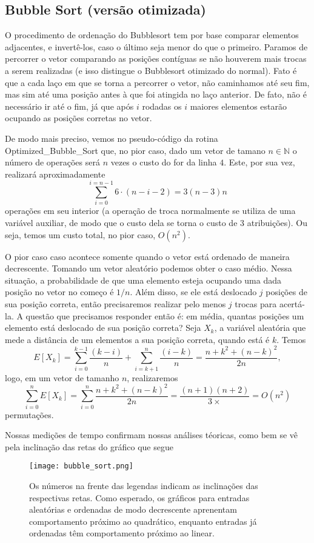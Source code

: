 \documentclass{article}
\begin{document}
\subsection{Bubble Sort (versão otimizada)}
O procedimento de ordenação do Bubblesort tem por base comparar elementos adjacentes, e invertê-los, caso o último seja menor do que o primeiro. Paramos de percorrer o vetor comparando as posições contíguas se não houverem mais trocas a serem realizadas (e isso distingue o Bubblesort otimizado do normal). Fato é que a cada laço em que se torna a percorrer o vetor, não caminhamos até seu fim, mas sim até uma posição antes à que foi atingida no laço anterior. De fato, não é necessário ir até o fim, já que após $i$ rodadas os $i$ maiores elementos estarão ocupando as posições corretas no vetor.\par
%
De modo mais preciso, vemos no pseudo-código da rotina Optimized\_Bubble\_Sort que, no pior caso, dado um vetor de tamano $n \in \mathbb{N}$ o número de operações será $n$ vezes o custo do for da linha $4$. Este, por sua vez, realizará aproximadamente 
\[\sum_{i = 0}^{i = n-1}6\cdot(n-i-2) = 3(n - 3)n\] operações em seu interior (a operação de troca normalmente se utiliza de uma variável auxiliar, de modo que o custo dela se torna o custo de 3 atribuições). Ou seja, temos um custo total, no pior caso, $O(n^2)$.\par
O pior caso caso acontece somente quando o vetor está ordenado de maneira decrescente. Tomando um vetor aleatório podemos obter o caso médio. Nessa situação, a probabilidade de que uma elemento esteja ocupando uma dada posição no vetor no começo é $1/n$. Além disso, se ele está deslocado $j$ posições de sua posição correta, então precisaremos realizar pelo menos $j$ trocas para acertá-la. A questão que precisamos responder então é: em média, quantas posições um elemento está deslocado de sua posição correta? Seja $X_k$, a variável aleatória que mede a distância de um elementos a sua posição correta, quando está é $k$. Temos \[E[X_k] = \sum_{i = 0}^{k-1}\frac{(k-i)}{n}+\sum_{i = k+1}^{n}\frac{(i - k)}{n} = \frac{n+k^{2}+(n-k)^{2}}{2n},\] logo, em um vetor de tamanho $n$, realizaremos \[\sum_{i=0}^{n}E[X_k] = \sum_{i=0}^{n}\frac{n+k^{2}+(n-k)^{2}}{2n} = \frac{(n+1)(n+2)}{3×} = O(n^2)\] permutações.\par
%
Nossas medições de tempo confirmam nossas análises téoricas, como bem se vê pela inclinação das retas do gráfico que segue
%
\begin{figure}[h]
    \centering
    \texttt{[image: bubble\_sort.png]}
    \caption{Os números na frente das legendas indicam as inclinações das respectivas retas. Como esperado, os gráficos para entradas aleatórias e ordenadas de modo decrescente aprenentam comportamento próximo ao quadrático, enquanto entradas já ordenadas têm comportamento próximo ao linear.}
\end{figure}
\end{document}
